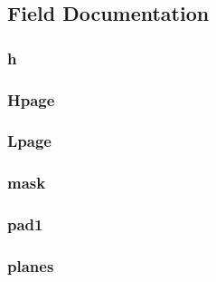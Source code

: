\subsection{Field Documentation}
\hypertarget{struct_b_m_h_d_a88c66af3b490ec9f8c011e646d75a99c}{
\subsubsection[{h}]{ h}}\label{struct_b_m_h_d_a88c66af3b490ec9f8c011e646d75a99c}
\hypertarget{struct_b_m_h_d_a997cf8e784e63092a5056748569808da}{
\subsubsection[{Hpage}]{ Hpage}}\label{struct_b_m_h_d_a997cf8e784e63092a5056748569808da}
\hypertarget{struct_b_m_h_d_a1b9806f908c0ffce82a998618c3a2c2a}{
\subsubsection[{Lpage}]{ Lpage}}\label{struct_b_m_h_d_a1b9806f908c0ffce82a998618c3a2c2a}
\hypertarget{struct_b_m_h_d_a6daf81b31bb6587923612db0ce9c56c0}{
\subsubsection[{mask}]{ mask}}\label{struct_b_m_h_d_a6daf81b31bb6587923612db0ce9c56c0}
\hypertarget{struct_b_m_h_d_afec1b929613c848fe533ccc070ad7e6f}{
\subsubsection[{pad1}]{ pad1}}\label{struct_b_m_h_d_afec1b929613c848fe533ccc070ad7e6f}
\hypertarget{struct_b_m_h_d_a104a6c0174090bda4a037dc41e2da53f}{
\subsubsection[{planes}]{ planes}}\label{struct_b_m_h_d_a104a6c0174090bda4a037dc41e2da53f}
